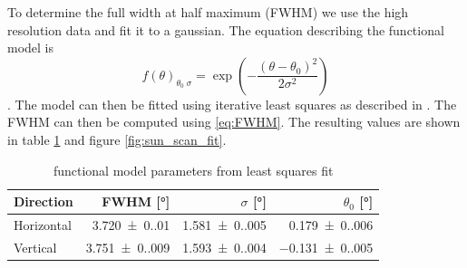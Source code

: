 To determine the full width at half maximum (FWHM) we use the high resolution data and fit it to a gaussian.
The equation describing the functional model is
\begin{equation}
    f(\theta)_{\theta_0\;\sigma} = \exp{\left(-\frac{(\theta-\theta_0)^2}{2\sigma^2}\right)}
\end{equation}.
The model can then be fitted using iterative least squares as described in \cite{adj_comp}. The FWHM can then be computed using \eqref{eq:FWHM}.
The resulting values are shown in table \ref{tab:params} and figure \ref{fig:sun_scan_fit}.
\begin{table}[H]
    \centering
    \begin{tabular}{lrrr}
        \toprule
        Direction & FWHM [\si{\degree}]& $ \sigma$ [\si{\degree}] & $ \theta_0 $ [\si{\degree}]\\
        \midrule
        Horizontal & \num{3.720(0.010)} & \num{1.581(0.005)} & \num{0.179(0.006)} \\
        Vertical & \num{3.751(0.009)} & \num{1.593(0.004)} & \num{-0.131(0.005)} \\
        \bottomrule
    \end{tabular}
    \caption{functional model parameters from least squares fit}
    \label{tab:params}
\end{table}
